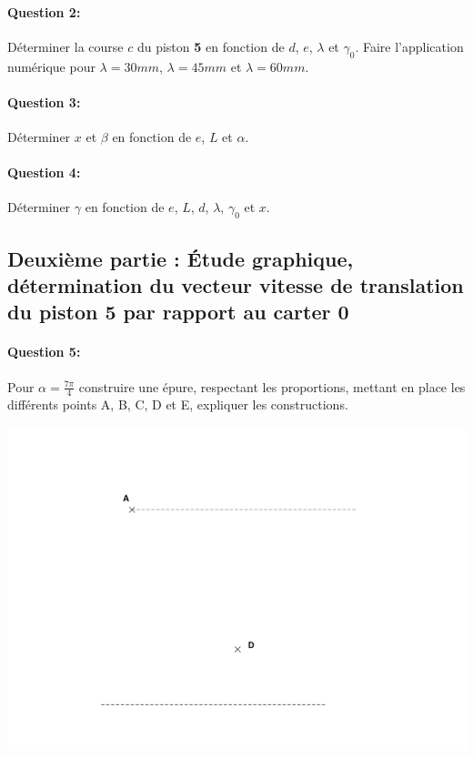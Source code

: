 \paragraph{Question 2:} Déterminer la course $c$ du piston \textbf{5} en fonction de $d$, $e$, $\lambda$ et $\gamma_0$. Faire l'application numérique pour $\lambda=30mm$, $\lambda=45mm$ et $\lambda=60mm$.

\paragraph{Question 3:} Déterminer $x$ et $\beta$ en fonction de $e$, $L$ et $\alpha$.

\paragraph{Question 4:} Déterminer $\gamma$ en fonction de $e$, $L$, $d$, $\lambda$, $\gamma_0$ et $x$.

\subsection{Deuxième partie : Étude graphique, détermination du vecteur vitesse de translation du piston 5 par rapport au carter 0}

\paragraph{Question 5:} Pour $\alpha=\frac{7\pi}{4}$ construire une épure, respectant les proportions, mettant en place les différents points A, B, C, D et E, expliquer les constructions.

\begin{center}
 \includegraphics[width=0.8\linewidth]{img/epure}
\end{center}
